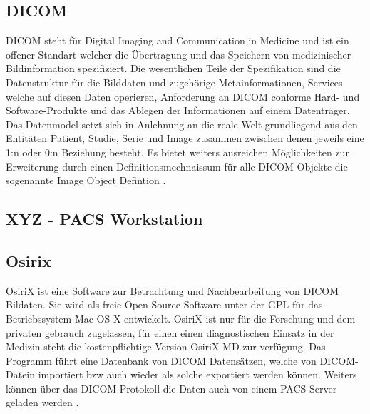 \subsection{DICOM}
\label{sec:DICOM}
DICOM steht für Digital Imaging and Communication in Medicine und ist ein offener Standart welcher die Übertragung und das Speichern von medizinischer Bildinformation spezifiziert.
Die wesentlichen Teile der Spezifikation sind die Datenstruktur für die Bilddaten und zugehörige Metainformationen, 
Services welche auf diesen Daten operieren, Anforderung an DICOM conforme Hard- und Software-Produkte und das Ablegen der Informationen auf einem Datenträger.
Das Datenmodel setzt sich in Anlehnung an die reale Welt grundliegend aus den Entitäten Patient, Studie, Serie und Image zusammen zwischen denen jeweils eine 1:n oder 0:n Beziehung besteht.
Es bietet weiters ausreichen Möglichkeiten zur Erweiterung durch einen Definitionsmechnaissum für alle DICOM Objekte die sogenannte Image Object Defintion \cite{pacs}.

\subsection{XYZ - PACS Workstation}
\label{sec:XYZ - PACS Workstation}


\subsection{Osirix}
\label{sec:Osirix}
OsiriX ist eine Software zur Betrachtung und Nachbearbeitung von DICOM Bildaten.
Sie wird als freie Open-Source-Software unter der GPL für das Betriebssystem Mac OS X entwickelt.
OsiriX ist nur für die Forschung und dem privaten gebrauch zugelassen, 
für einen einen diagnostischen Einsatz in der Medizin steht die kostenpflichtige Version OsiriX MD zur verfügung.
%
Das Programm führt eine Datenbank von DICOM Datensätzen, 
welche von DICOM-Datein importiert bzw auch wieder als solche exportiert werden können.
Weiters können über das DICOM-Protokoll die Daten auch von einem PACS-Server geladen werden \cite{osirix}.

